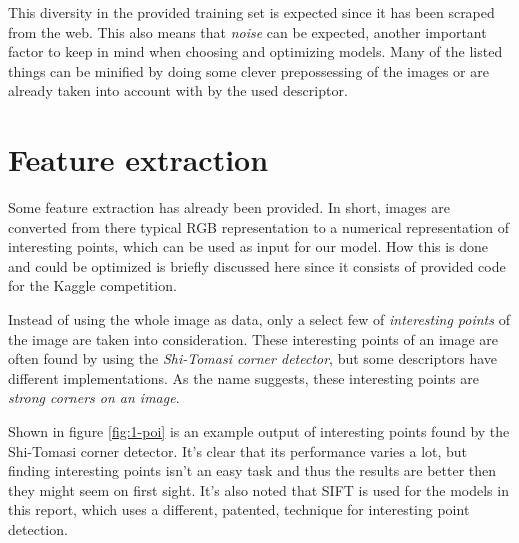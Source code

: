 This diversity in the provided training set is expected since it has been scraped from the web.
This also means that \emph{noise} can be expected, another important factor to keep in mind when choosing and optimizing models.
Many of the listed things can be minified by doing some clever prepossessing of the images or are already taken into account with by the used descriptor.



\section{Feature extraction}
\label{section:DA_feature_extraction}

Some feature extraction has already been provided.
In short, images are converted from there typical RGB representation to a numerical representation of interesting points, which can be used as input for our model.
How this is done and could be optimized is briefly discussed here since it consists of provided code for the Kaggle competition.

Instead of using the whole image as data, only a select few of \textit{interesting points} of the image are taken into consideration.
These interesting points of an image are often found by using the \emph{Shi-Tomasi corner detector}, but some descriptors have different implementations.
As the name suggests, these interesting points are \textit{strong corners on an image}.

Shown in figure \ref{fig:1-poi} is an example output of interesting points found by the Shi-Tomasi corner detector.
It's clear that its performance varies a lot, but finding interesting points isn't an easy task and thus the results are better then they might seem on first sight.
It's also noted that SIFT is used for the models in this report, which uses a different, patented, technique for interesting point detection.

